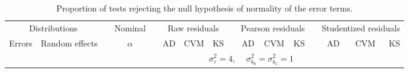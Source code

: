 


\begin{table}[ht]
\centering
\caption{\label{tab:eval1} Proportion of tests rejecting the null hypothesis of normality of the error terms.}
\begin{scriptsize}
\begin{tabular}{ll p{.1cm} c p{.1cm} rrr p{.1cm} rrr p{.1cm} rrr}
  \hline
  \multicolumn{2}{c}{Distributions}& & Nominal & &  \multicolumn{3}{c}{Raw residuals} & & \multicolumn{3}{c}{Pearson residuals} & & \multicolumn{3}{c}{Studentized residuals}\\ \cline{1-2} \cline{6-8} \cline{10-12} \cline{14-16}
  Errors & Random effects & & $\alpha$ & & AD & CVM & KS & & AD & CVM & KS & & AD & CVM & KS \\ 
   \hline
& && && \multicolumn{9}{c}{$\sigma_{\varepsilon}^2 = 4$, \ \ $\sigma_{b_0}^2 = \sigma_{b_1}^2 = 1$} \\ \cline{6-16}


\end{tabular}
\end{scriptsize}
\end{table}
